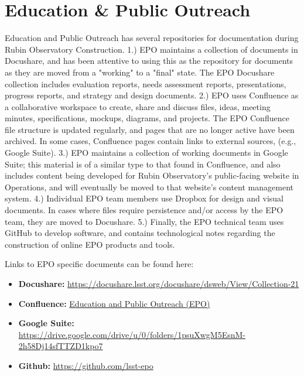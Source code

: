 \newpage
\section{Education \& Public Outreach}

Education and Public Outreach has several repositories for documentation during Rubin Observatory Construction. 1.) EPO maintains a collection of documents in Docushare, and has been attentive to using this as the repository for documents as they are moved from a "working" to a "final" state. The EPO Docushare collection includes evaluation reports, needs assessment reports, presentations, progress reports, and strategy and design documents. 2.) EPO uses Confluence as a collaborative workspace to create, share and discuss files, ideas, meeting minutes, specifications, mockups, diagrams, and projects. The EPO Confluence file structure is updated regularly, and pages that are no longer active have been archived. In some cases, Confluence pages contain links to external sources, (e.g., Google Suite).  3.) EPO maintains a collection of working documents in Google Suite; this material is of a similar type to that found in Confluence, and also includes content being developed for Rubin Observatory's public-facing website in Operations, and will eventually be moved to that website's content management system. 4.) Individual EPO team members use Dropbox for design and visual documents. In cases where files require persistence and/or access by the EPO team, they are moved to Docushare. 5.) Finally, the EPO technical team uses GitHub to develop software, and contains technological notes regarding the construction of online EPO products and tools.

Links to EPO specific documents can be found here:

\begin{itemize}

	\item {\bf Docushare:}  \url{https://docushare.lsst.org/docushare/dsweb/View/Collection-21}
	\item {\bf Confluence:} \href{https://confluence.lsstcorp.org/pages/viewpage.action?pageId=25690606}{Education and Public Outreach (EPO)}
	\item {\bf Google Suite:}  \url{https://drive.google.com/drive/u/0/folders/1psuXwgM5EsnM-2h58Dj14sfTTZD1kpo7}
	\item {\bf Github:} \url{https://github.com/lsst-epo}
	
\end{itemize}

